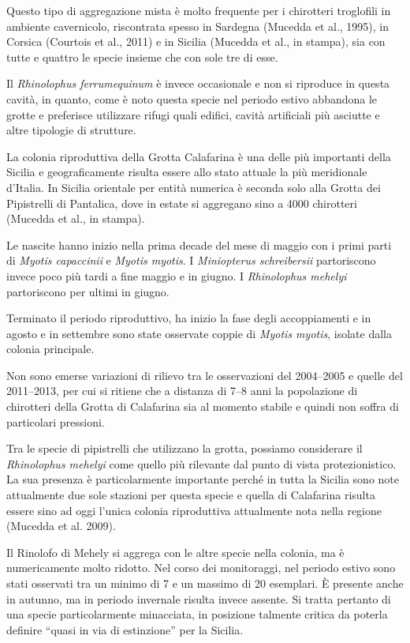 \begin{multicols}{2}
Questo tipo di aggregazione mista è molto frequente per i chirotteri troglofili in ambiente cavernicolo, riscontrata spesso in Sardegna (Mucedda et al., 1995), in Corsica (Courtois et al., 2011) e in Sicilia (Mucedda et al., in stampa), sia con tutte e quattro le specie insieme che con sole tre di esse.

Il \emph{Rhinolophus ferrumequinum} è invece occasionale e non si riproduce in questa cavità, in quanto, come è noto questa specie nel periodo estivo abbandona le grotte e preferisce utilizzare rifugi quali edifici, cavità artificiali più asciutte e altre tipologie di strutture.

La colonia riproduttiva della Grotta Calafarina è una delle più importanti della Sicilia e geograficamente risulta essere allo stato attuale la più meridionale d'Italia. In Sicilia orientale per entità numerica è seconda solo alla Grotta dei Pipistrelli di Pantalica, dove in estate si aggregano sino a 4000 chirotteri (Mucedda et al., in stampa).

Le nascite hanno inizio nella prima decade del mese di maggio con i primi parti di \emph{Myotis capaccinii} e \emph{Myotis myotis}. I \emph{Miniopterus schreibersii} partoriscono invece poco più tardi a fine maggio e in giugno. I \emph{Rhinolophus mehelyi} partoriscono per ultimi in giugno.

Terminato il periodo riproduttivo, ha inizio la fase degli accoppiamenti e in agosto e in settembre sono state osservate coppie di \emph{Myotis myotis}, isolate dalla colonia principale.

Non sono emerse variazioni di rilievo tra le osservazioni del 2004--2005 e quelle del 2011--2013, per cui si ritiene che a distanza di 7--8 anni la popolazione di chirotteri della Grotta di Calafarina sia al momento stabile e quindi non soffra di particolari pressioni.

Tra le specie di pipistrelli che utilizzano la grotta, possiamo considerare il \emph{Rhinolophus mehelyi} come quello più rilevante dal punto di vista protezionistico. La sua presenza è particolarmente importante perché in tutta la Sicilia sono note attualmente due sole stazioni per questa specie e quella di Calafarina risulta essere sino ad oggi l’unica colonia riproduttiva attualmente nota nella regione (Mucedda et al. 2009). 

Il Rinolofo di Mehely si aggrega con le altre specie nella colonia, ma è numericamente molto ridotto. Nel corso dei monitoraggi, nel periodo estivo sono stati osservati tra un minimo di 7 e un massimo di 20 esemplari. È presente anche in autunno, ma in periodo invernale risulta invece assente. Si tratta pertanto di una specie particolarmente minacciata, in posizione talmente critica da poterla definire ``quasi in via di estinzione'' per la Sicilia.


\end{multicols}
